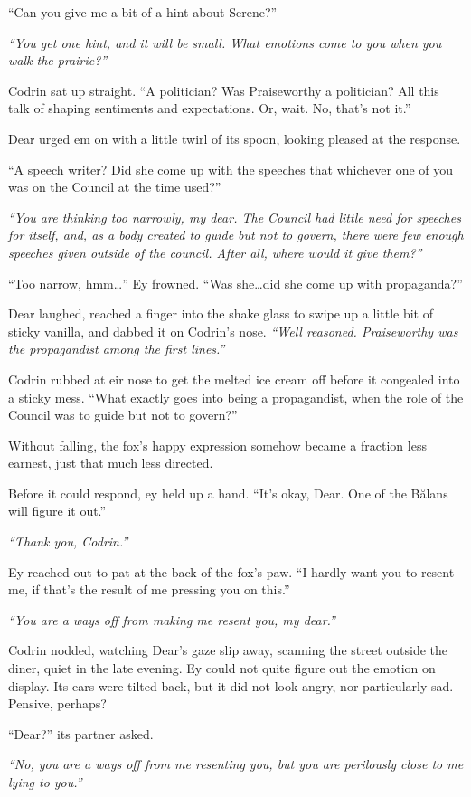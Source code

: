 ``Can you give me a bit of a hint about Serene?''

\emph{``You get one hint, and it will be small. What emotions come to you when you walk the prairie?''}

Codrin sat up straight. ``A politician? Was Praiseworthy a politician? All this talk of shaping sentiments and expectations. Or, wait. No, that's not it.''

Dear urged em on with a little twirl of its spoon, looking pleased at the response.

``A speech writer? Did she come up with the speeches that whichever one of you was on the Council at the time used?''

\emph{``You are thinking too narrowly, my dear. The Council had little need for speeches for itself, and, as a body created to guide but not to govern, there were few enough speeches given outside of the council. After all, where would it give them?''}

``Too narrow, hmm\ldots{}'' Ey frowned. ``Was she\ldots did she come up with propaganda?''

Dear laughed, reached a finger into the shake glass to swipe up a little bit of sticky vanilla, and dabbed it on Codrin's nose. \emph{``Well reasoned. Praiseworthy was the propagandist among the first lines.''}

Codrin rubbed at eir nose to get the melted ice cream off before it congealed into a sticky mess. ``What exactly goes into being a propagandist, when the role of the Council was to guide but not to govern?''

Without falling, the fox's happy expression somehow became a fraction less earnest, just that much less directed.

Before it could respond, ey held up a hand. ``It's okay, Dear. One of the Bălans will figure it out.''

\emph{``Thank you, Codrin.''}

Ey reached out to pat at the back of the fox's paw. ``I hardly want you to resent me, if that's the result of me pressing you on this.''

\emph{``You are a ways off from making me resent you, my dear.''}

Codrin nodded, watching Dear's gaze slip away, scanning the street outside the diner, quiet in the late evening. Ey could not quite figure out the emotion on display. Its ears were tilted back, but it did not look angry, nor particularly sad. Pensive, perhaps?

``Dear?'' its partner asked.

\emph{``No, you are a ways off from me resenting you, but you are perilously close to me lying to you.''}
